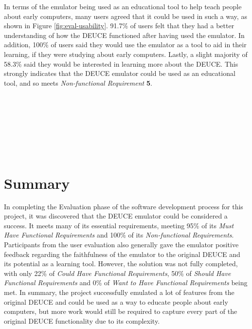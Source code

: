 \documentclass{l4proj}
\begin{document}
In terms of the emulator being used as an educational tool to help teach people about early computers, many users agreed that it could be used in such a way, as shown in Figure \ref{fig:eval-usability}. 91.7\% of users felt that they had a better understanding of how the DEUCE functioned after having used the emulator. In addition, 100\% of users said they would use the emulator as a tool to aid in their learning, if they were studying about early computers. Lastly, a slight majority of 58.3\% said they would be interested in learning more about the DEUCE. This strongly indicates that the DEUCE emulator could be used as an educational tool, and so meets \textit{Non-functional Requirement} \textbf{5}. \\ \\ \\ \\ \\ \\ \\ \\


\section{Summary}
In completing the Evaluation phase of the software development process for this project, it was discovered that the DEUCE emulator could be considered a success. It meets many of its essential requirements, meeting 95\% of its \textit{Must Have Functional Requirements} and 100\% of its \textit{Non-functional Requirements}. Participants from the user evaluation also generally gave the emulator positive feedback regarding the faithfulness of the emulator to the original DEUCE and its potential as a learning tool. However, the solution was not fully completed, with only 22\% of \textit{Could Have Functional Requirements}, 50\% of \textit{Should Have Functional Requirements} and 0\% of \textit{Want to Have Functional Requirements} being met. In summary, the project successfully emulated a lot of features from the original DEUCE and could be used as a way to educate people about early computers, but more work would still be required to capture every part of the original DEUCE functionality due to its complexity.

\end{document}
